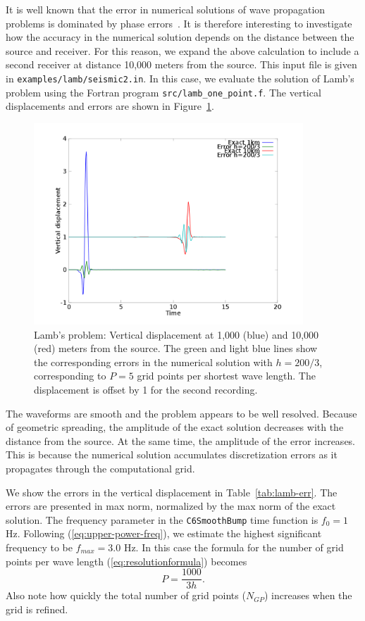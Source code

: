 \documentclass[11pt]{report}
\begin{document}
It is well known that the error in numerical solutions of wave propagation problems is dominated by
phase errors~\cite{Gustafsson-Kreiss-Oliger}. It is therefore interesting to investigate how the
accuracy in the numerical solution depends on the distance between the source and receiver. For this
reason, we expand the above calculation to include a second receiver at distance 10,000 meters from
the source. This input file is given in {\tt examples/lamb/seismic2.in}. In this case, we evaluate
the solution of Lamb's problem using the Fortran program {\tt src/lamb\_one\_point.f}. The vertical
displacements and errors are shown in Figure~\ref{fig:lambSAC}.
\begin{figure}[ht]
  \begin{center}
    \includegraphics[width=0.9\textwidth]{lamb-err-h66.png}
    \caption{Lamb's problem: Vertical displacement at 1,000 (blue) and 10,000 (red) meters from the
      source. The green and light blue lines show the corresponding errors in the
      numerical solution with $h=200/3$, corresponding to $P=5$ grid points per shortest wave
      length. The displacement is offset by 1 for the second recording.}
    \label{fig:lambSAC}
  \end{center}
\end{figure}
The waveforms are smooth and the problem appears to be well resolved. Because of geometric
spreading, the amplitude of the exact solution decreases with the distance from the source. At the
same time, the amplitude of the error increases. This is because the numerical solution accumulates
discretization errors as it propagates through the computational grid.

We show the errors in the vertical displacement in Table~\ref{tab:lamb-err}. The errors are
presented in max norm, normalized by the max norm of the exact solution. The
frequency parameter in the {\tt C6SmoothBump} time function is $f_0=1$ Hz. Following
(\ref{eq:upper-power-freq}), we estimate the highest significant frequency to be $f_{max}=3.0$
Hz. In this case the formula for the number of grid points per wave length
(\ref{eq:resolutionformula}) becomes
\[
P=\frac{1000}{3 h}.
\]
Also note how quickly the total number of grid points ($N_{GP}$) increases when the grid is
refined. 
\end{document}
